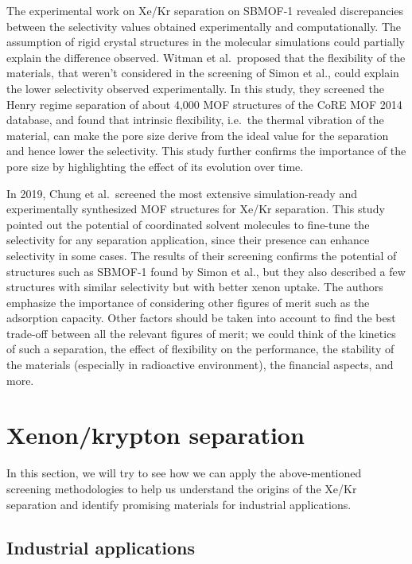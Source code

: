 \documentclass[main.tex]{subfiles}
\begin{document}
The experimental work on Xe/Kr separation on SBMOF-1 revealed discrepancies between the selectivity values obtained experimentally and computationally.\cite{Banerjee_2016} {The assumption of rigid crystal structures in the molecular simulations could partially explain the difference observed.} Witman et al.\ proposed that the flexibility of the materials, that weren't considered in the screening of Simon et al., could explain the lower selectivity observed experimentally.\cite{Witman_2017} In this study, they screened the Henry regime separation of about 4,000 MOF structures of the CoRE MOF 2014 database\cite{Chung_2014}, and found that intrinsic flexibility, i.e.\ the thermal vibration of the material, can make the pore size derive from the ideal value for the separation and hence lower the selectivity. This study further confirms the importance of the pore size by highlighting the effect of its evolution over time.

In 2019, Chung et al.\ screened the most extensive simulation-ready and experimentally synthesized MOF structures for Xe/Kr separation.\cite{Chung_2019} This study pointed out the potential of coordinated solvent molecules to fine-tune the selectivity for any separation application, since their presence can enhance selectivity in some cases. The results of their screening confirms the potential of structures such as SBMOF-1 found by Simon et al., but they also described a few structures with similar selectivity but with better xenon uptake. The authors emphasize the importance of considering other figures of merit such as the adsorption capacity. Other factors should be taken into account to find the best trade-off between all the relevant figures of merit; we could think of the kinetics of such a separation, the effect of flexibility on the performance, the stability of the materials (especially in radioactive environment), the financial aspects, and more.


\section{Xenon/krypton separation}

In this section, we will try to see how we can apply the above-mentioned screening methodologies to help us understand the origins of the Xe/Kr separation and identify promising materials for industrial applications. 

\subsection{Industrial applications}
\end{document}
